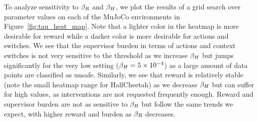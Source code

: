 To analyze sensitivity to $\beta_{R}$ and $\beta_{H}$, we plot the results of a grid search over parameter values on each of the MuJoCo environments in Figure~\ref{fig:tau_heat_map}. Note that a lighter color in the heatmap is more desirable for reward while a darker color is more desirable for actions and switches. We see that the supervisor burden in terms of actions and context switches is not very sensitive to the threshold as we increase $\beta_{H}$ but jumps significantly for the very low setting ($\beta_{H} = 5\times 10^{-4}$) as a large amount of data points are classified as unsafe. Similarly, we see that reward is relatively stable (note the small heatmap range for HalfCheetah) as we decrease $\beta_{H}$ but can suffer for high values, as interventions are not requested frequently enough. Reward and supervisor burden are not as sensitive to $\beta_{R}$ but follow the same trends we expect, with higher reward and burden as $\beta_{R}$ decreases.


